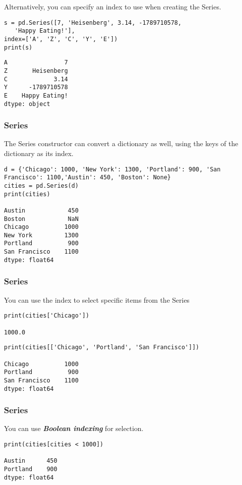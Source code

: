 \begin{frame}[fragile]
Alternatively, you can specify an index to use when creating the Series.
\begin{lstlisting}
s = pd.Series([7, 'Heisenberg', 3.14, -1789710578, 
   'Happy Eating!'],
index=['A', 'Z', 'C', 'Y', 'E'])
print(s)
\end{lstlisting}
\begin{lstlisting}
A                7
Z       Heisenberg
C             3.14
Y      -1789710578
E    Happy Eating!
dtype: object
\end{lstlisting}
\end{frame}

\begin{frame}[fragile]\frametitle{Series}		
The Series constructor can convert a dictionary as well, using the keys of the dictionary as its index.
\begin{lstlisting}
d = {'Chicago': 1000, 'New York': 1300, 'Portland': 900, 'San Francisco': 1100,'Austin': 450, 'Boston': None}
cities = pd.Series(d)
print(cities)

Austin            450
Boston            NaN
Chicago          1000
New York         1300
Portland          900
San Francisco    1100
dtype: float64
\end{lstlisting}
\end{frame}

\begin{frame}[fragile]\frametitle{Series}		
You can use the index to select specific items from the Series 
\begin{lstlisting}
print(cities['Chicago'])

1000.0
\end{lstlisting}

\begin{lstlisting}
print(cities[['Chicago', 'Portland', 'San Francisco']])

Chicago          1000
Portland          900
San Francisco    1100
dtype: float64
\end{lstlisting}
\end{frame}

\begin{frame}[fragile]\frametitle{Series}		
You can use \textbf{\textit{Boolean indexing}} for selection.
\begin{lstlisting}
print(cities[cities < 1000])

Austin      450
Portland    900
dtype: float64
\end{lstlisting}
\end{frame}

